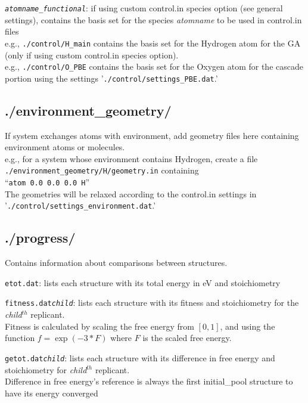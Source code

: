 \texttt{{\em atomname}\_{\em functional}}: if using custom control.in species option (see general settings), contains the basis set for the species {\em atomname} to be used in control.in files\\
e.g., \texttt{./control/H\_main} contains the basis set for the Hydrogen atom for the GA (only if using custom control.in species option).\\
e.g., \texttt{./control/O\_PBE} contains the basis set for the Oxygen atom for the cascade portion using the settings '\texttt{./control/settings\_PBE.dat}.'

\subsection{./environment\_geometry/}

If system exchanges atoms with environment, add geometry files here containing environment atoms or molecules.\\
e.g., for a system whose environment contains Hydrogen, create a file\\ \texttt{./environment\_geometry/H/geometry.in} containing \\``\texttt{atom \hspace{7 mm} 0.0 \hspace{7 mm} 0.0 \hspace{7 mm} 0.0 \hspace{7 mm} H}''\\
The geometries will be relaxed according to the control.in settings in \\ '\texttt{./control/settings\_environment.dat}.'

\subsection{./progress/}

Contains information about comparisons between structures.

\texttt{etot.dat}: lists each structure with its total energy in eV and stoichiometry

\texttt{fitness.dat{\em child}}: lists each structure with its fitness and stoichiometry for the {\em child}$^{th}$ replicant.\\
 Fitness is calculated by scaling the free energy from $[0,1]$, and using the function $f = \exp(-3*F)$ where $F$ is the scaled free energy. %

\texttt{getot.dat{\em child}}: lists each structure with its difference in free energy and stoichiometry for {\em child}$^{th}$ replicant.\\
 Difference in free energy's reference is always the first initial\_pool structure to have its energy converged

